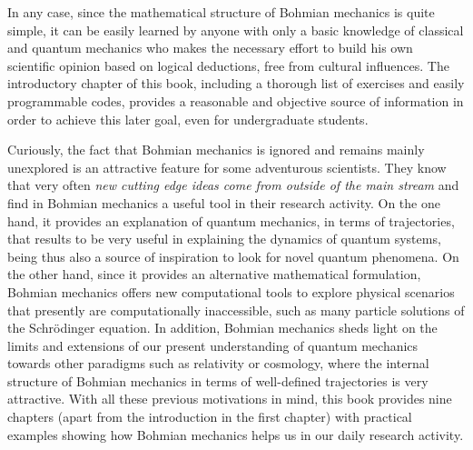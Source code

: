 \documentclass[nofootinbib, secnumarabic, amsmath, nobibnotes,10pt,aps,pra]{revtex4-1}
\begin{document}
In any case, since the mathematical structure of Bohmian mechanics is quite simple, it can be easily learned by anyone with only a basic knowledge of classical and quantum mechanics who makes the necessary effort to build his own scientific opinion based on logical deductions, free from cultural influences. The introductory chapter of this book, including a thorough list of exercises and easily programmable codes, provides a reasonable and objective source of information in order to achieve this later goal, even for undergraduate students.

Curiously, the fact that Bohmian mechanics is ignored and remains mainly unexplored is an attractive feature for some adventurous scientists. They know that very often \emph{new cutting edge ideas come from outside of the main stream} and find in Bohmian mechanics a useful tool in their research activity. On the one hand, it provides an explanation of quantum mechanics, in terms of trajectories, that results to be very useful in explaining the dynamics of quantum systems, being thus also a source of inspiration to look for novel quantum phenomena. On the other hand, since it provides an alternative mathematical formulation, Bohmian mechanics offers new computational tools to explore physical scenarios that presently are computationally inaccessible, such as many particle solutions of the Schr\"odinger equation. In addition, Bohmian mechanics sheds light on the limits and extensions of our present understanding of quantum mechanics towards other paradigms such as relativity or cosmology, where the internal structure of Bohmian mechanics in terms of well-defined trajectories is very attractive. With all these previous motivations in mind, this book provides nine chapters (apart from the introduction in the first chapter) with practical examples showing how Bohmian mechanics helps us in our daily research activity.
\end{document}
